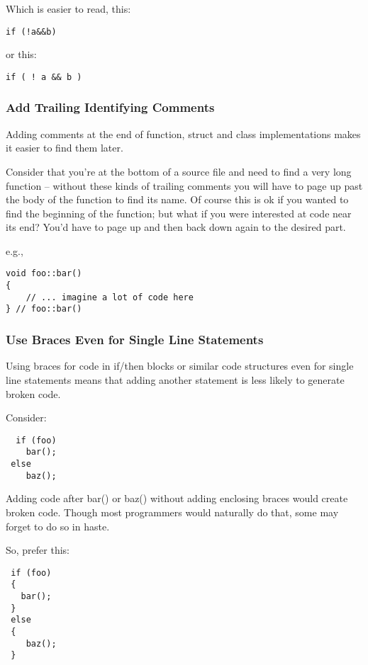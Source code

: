 Which is easier to read, this:

\begin{verbatim}
if (!a&&b)
\end{verbatim}

or this:

\begin{verbatim}
if ( ! a && b )
\end{verbatim}

\hypertarget{toc26}{}
\subsubsection{Add Trailing Identifying Comments}
Adding comments at the end of function, struct and class implementations makes
it easier to find them later.

Consider that you're at the bottom of a source file and need to find a very
long function -- without these kinds of trailing comments you will have to page
up past the body of the function to find its name.  Of course this is ok if you
wanted to find the beginning of the function; but what if you were interested
at code near its end?  You'd have to page up and then back down again to the
desired part.

e.g.,

\begin{verbatim}
void foo::bar()
{ 
    // ... imagine a lot of code here 
} // foo::bar()
\end{verbatim}

\hypertarget{toc27}{}
\subsubsection{Use Braces Even for Single Line Statements}
Using braces for code in if/then blocks or similar code structures even for
single line statements means that adding another statement is less likely to
generate broken code.

Consider:

\begin{verbatim}
  if (foo)
    bar();
 else
    baz();
\end{verbatim}

Adding code after bar() or baz() without adding enclosing braces would create
broken code.  Though most programmers would naturally do that, some may forget
to do so in haste.

So, prefer this:

\begin{verbatim}
 if (foo)
 {
   bar();
 }
 else
 { 
    baz();
 } 
\end{verbatim}

